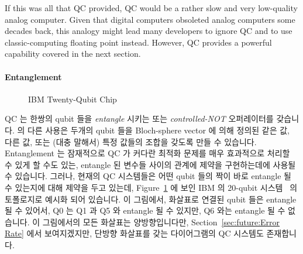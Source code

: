 If this was all that QC provided, QC would be a rather slow and very
low-quality analog computer.
Given that digital computers obsoleted analog computers some decades back,
this analogy might lead many developers to ignore QC and to
use classic-computing floating point instead.
However, QC provides a powerful capability covered in the next section.
\fi

\paragraph{Entanglement}

\begin{figure}[tb]
\centering
{}
\caption{IBM Twenty-Qubit Chip}
\label{fig:future:IBM Twenty-Qubit Chip}
\end{figure}

QC 는 한쌍의 qubit 들을 \emph{entangle} 시키는  또는
\emph{controlled-NOT} 오퍼레이터를 갖습니다.
 의 다른 사용은 두개의 qubit 들을 Bloch-sphere vector 에 의해 정의된
같은 값, 다른 값, 또는 (대충 말해서) 특정 값들의 조합을 갖도록 만들 수
있습니다.
Entanglement 는 잠재적으로 QC 가 커다란 최적화 문제를 매우 효과적으로 처리할 수
있게 할 수도 있는, entangle 된 변수들 사이의 관계에 제약을 구현하는데에 사용될
수 있습니다.
그러나, 현재의 QC 시스템들은 어떤 qubit 들의 짝이 바로 entangle 될 수 있는지에
대해 제약을 두고 있는데,
Figure~\ref{fig:future:IBM Twenty-Qubit Chip} 에 보인 IBM 의 20-qubit
시스템~\cite{IBMResearch2018QCsystems} 의 토폴로지로 예시화 되어 있습니다.
이 그림에서, 화살표로 연결된 qubit 들은 entangle 될 수 있어서, Q0 는 Q1 과 Q5
와 entangle 될 수 있지만, Q6 와는 entangle 될 수 없습니다.
이 그림에서의 모든 화살표는 양방향입니다만,
Section~\ref{sec:future:Error Rate} 에서 보여지겠지만, 단방향 화살표를 갖는
다이어그램의 QC 시스템도 존재합니다.
\iffalse

